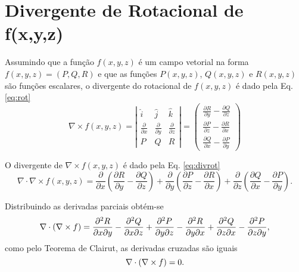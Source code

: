 \section{Divergente de Rotacional de f(x,y,z)} \label{sec:ex2}
Assumindo que a fun\c{c}\~ao ${f}(x,y,z)$ \'e um campo vetorial na forma ${f}(x,y,z) = (P, Q, R)$ e que as fun\c{c}\~oes $P(x,y,z)$, $Q(x,y,z)$ e $R(x,y,z)$ s\~ao fun\c{c}\~oes escalares, o divergente do rotacional de ${f}(x,y,z)$ \'e dado pela Eq. \eqref{eq:rot}
\begin{equation}
    \label{eq:rot}
    \nabla \times {f}(x,y,z) = \left| \begin{array}{ccc}
        \hat{i} & \hat{j} & \hat{k} \\
        \frac{\partial}{\partial x} & \frac{\partial}{\partial y} & \frac{\partial}{\partial z} \\
        P & Q & R
    \end{array} \right| = 
    \left(\begin{array}{ccc}
         \frac{\partial R}{\partial y} - \frac{\partial Q}{\partial z} \\
        \frac{\partial P}{\partial z} - \frac{\partial R}{\partial x} \\
         \frac{\partial Q}{\partial x} - \frac{\partial P}{\partial y} 
    \end{array}
    \right)
\end{equation}

O divergente de $\nabla \times {f}(x,y,z)$ \'e dado pela Eq. \eqref{eq:divrot}
\begin{equation}
    \label{eq:divrot}
    \nabla \cdot \nabla \times {f}(x,y,z) = \frac{\partial}{\partial x} \left( \frac{\partial R}{\partial y} - \frac{\partial Q}{\partial z} \right) + 
    \frac{\partial}{\partial y} \left( \frac{\partial P}{\partial z} - \frac{\partial R}{\partial x} \right) + 
    \frac{\partial}{\partial z} \left( \frac{\partial Q}{\partial x} - \frac{\partial P}{\partial y} \right).
\end{equation}

Distribuindo as derivadas parciais obt\'em-se
\begin{equation*}
    \nabla \cdot (\nabla \times f) = 
    \frac{\partial^2 R}{\partial x\partial y} - \frac{\partial^2 Q}{\partial x\partial z} + 
    \frac{\partial^2 P}{\partial y\partial z} - \frac{\partial^2 R}{\partial y\partial x}  + 
    \frac{\partial^2 Q}{\partial z\partial x} - \frac{\partial^2 P}{\partial z \partial y},
\end{equation*}
como pelo Teorema de Clairut, as derivadas cruzadas s\~ao iguais
\begin{equation}
    \nabla \cdot (\nabla \times f) = 0.
\end{equation}